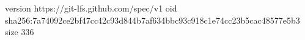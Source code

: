 version https://git-lfs.github.com/spec/v1
oid sha256:7a74092ce2bf47cc42c93d844b7af634bbc93c918c1e74cc23b5cac48577e5b3
size 336
